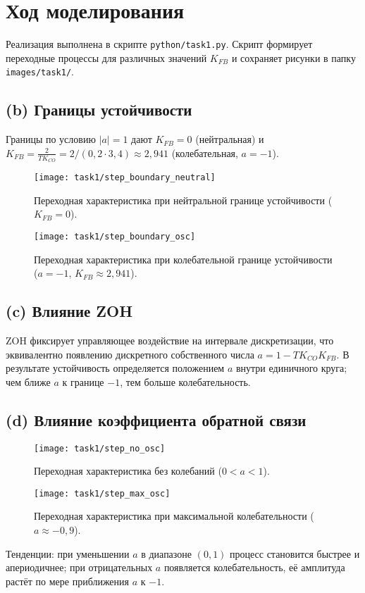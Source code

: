 \section{Ход моделирования}
Реализация выполнена в скрипте \texttt{python/task1.py}. Скрипт формирует переходные процессы для различных значений \(K_{FB}\) и сохраняет рисунки в папку \texttt{images/task1/}.

\subsection*{(b) Границы устойчивости}
Границы по условию \(|a|=1\) дают \(K_{FB}=0\) (нейтральная) и \(K_{FB}=\tfrac{2}{T K_{CO}}=2/(0{,}2\cdot3{,}4)\approx2{,}941\) (колебательная, \(a=-1\)).
\begin{figure}[H]
  \centering
  \texttt{[image: task1/step\_boundary\_neutral]}
  \caption{Переходная характеристика при нейтральной границе устойчивости (\(K_{FB}=0\)).}
  \label{fig:task1_neutral}
\end{figure}
\begin{figure}[H]
  \centering
  \texttt{[image: task1/step\_boundary\_osc]}
  \caption{Переходная характеристика при колебательной границе устойчивости (\(a=-1\), \(K_{FB}\approx2{,}941\)).}
  \label{fig:task1_osc}
\end{figure}

\subsection*{(c) Влияние ZOH}
ZOH фиксирует управляющее воздействие на интервале дискретизации, что эквивалентно появлению дискретного собственного числа \(a=1-TK_{CO}K_{FB}\). В результате устойчивость определяется положением \(a\) внутри единичного круга; чем ближе \(a\) к границе \(-1\), тем больше колебательность.

\subsection*{(d) Влияние коэффициента обратной связи}
\begin{figure}[H]
  \centering
  \texttt{[image: task1/step\_no\_osc]}
  \caption{Переходная характеристика без колебаний (\(0<a<1\)).}
  \label{fig:task1_no_osc}
\end{figure}
\begin{figure}[H]
  \centering
  \texttt{[image: task1/step\_max\_osc]}
  \caption{Переходная характеристика при максимальной колебательности (\(a\approx-0{,}9\)).}
  \label{fig:task1_max_osc}
\end{figure}
Тенденции: при уменьшении \(a\) в диапазоне \((0,1)\) процесс становится быстрее и апериодичнее; при отрицательных \(a\) появляется колебательность, её амплитуда растёт по мере приближения \(a\) к \(-1\).

